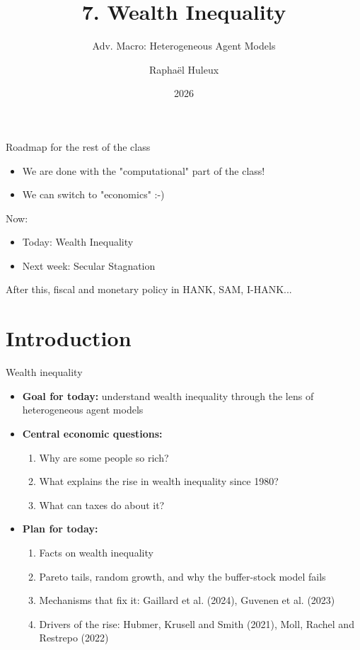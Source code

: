 \documentclass[10pt,english,10pt]{beamer}
\begin{document}
\title{7. Wealth Inequality \vspace{-2mm}}
\subtitle{Adv. Macro: Heterogeneous Agent Models}
\author{Raphaël Huleux}
\date{2026}

{
\begin{frame}

\maketitle

\end{frame}
}

\addtocounter{framenumber}{-1}

\begin{frame}{Roadmap for the rest of the class}

\begin{itemize}
\item We are done with the "computational" part of the class!
\item We can switch to "economics" :-)
\end{itemize}

Now:
\begin{itemize}
\item[7.] Today: Wealth Inequality
\item[8.] Next week: Secular Stagnation
\end{itemize}
After this, fiscal and monetary policy in HANK, SAM, I-HANK...
\end{frame}

\section{Introduction}

\begin{frame}{Wealth inequality}
\begin{itemize}
\item \textbf{Goal for today:} understand wealth inequality through the lens of heterogeneous agent models
\item \textbf{Central economic questions:}
\begin{enumerate}
\item Why are some people so rich?
\item What explains the rise in wealth inequality since 1980?
\item What can taxes do about it?
\end{enumerate}
\item \textbf{Plan for today:}
\begin{enumerate}
\item Facts on wealth inequality
\item Pareto tails, random growth, and why the buffer-stock model fails
\item Mechanisms that fix it: Gaillard et al. (2024), Guvenen et al. (2023)
\item Drivers of the rise: Hubmer, Krusell and Smith (2021), Moll, Rachel and Restrepo (2022)
\end{enumerate}
\end{itemize}
\end{frame}
\end{document}
